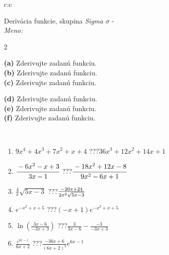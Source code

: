 \documentclass[10pt]{report}
\begin{document}
\newpage
\thispagestyle{empty}
\begin{tabular}{c:c}
\begin{minipage}[c][104.5mm][t]{0.5\linewidth}
\begin{center}
\vspace{7mm}
{\huge Derivácia funkcie, skupina \textit{Sigma $\sigma$} -}\\[5mm]
\textit{Meno:}\phantom{xxxxxxxxxxxxxxxxxxxxxxxxxxxxxxxxxxxxxxxxxxxxxxxxxxxxxxxxxxxxxxxxx}\\[5mm]
\begin{minipage}{0.95\linewidth}
\begin{center}
{\small \begin{multicols}{2} \raggedright
\textbf{(a)} Zderivujte zadanú funkciu. \\[1mm]
\textbf{(b)} Zderivujte zadanú funkciu. \\[1mm]
\textbf{(c)} Zderivujte zadanú funkciu. \par \columnbreak
\textbf{(d)} Zderivujte zadanú funkciu. \\[1mm]
\textbf{(e)} Zderivujte zadanú funkciu. \\[1mm]
\textbf{(f)} Zderivujte zadanú funkciu.
\end{multicols}
}
\end{center}
\end{minipage}
\\[4mm]
\begin{minipage}{0.79\linewidth}
\begin{center}
\begin{varwidth}{\linewidth}
\begin{enumerate}
\normalsize
\item $9x^4+4x^3+7x^2+x+4$\quad \dotfill\; ???\;\dotfill \quad $36x^3+12x^2+14x+1$
\item $\cfrac{-6x^2-x+3}{3x-1}$\quad \dotfill\; ???\;\dotfill \quad $\cfrac{-18x^2+12x-8}{9x^2-6x+1}$
\item $\frac{4}{x}\sqrt{5x-3}$\quad \dotfill\; ???\;\dotfill \quad $\frac{-20x+24}{2x^2 \sqrt{\smash[b]{5x-3}}}$
\item $e^{-x^2+x+5}$\quad \dotfill\; ???\;\dotfill \quad $(-x+1)e^{-x^2+x+5}$
\item $\ln{\left(\frac{3x-6}{-3x+3}\right)}$\quad \dotfill\; ???\;\dotfill \quad $\frac{3}{3x-6}-\frac{-3}{-3x+3}$
\item $\frac{e^{6x-1}}{6x+2}$\quad \dotfill\; ???\;\dotfill \quad $\frac{-36x+6}{(6x+2)^2}e^{6x-1}$
\end{enumerate}

\end{varwidth}
\end{center}
\end{minipage}
\end{center}
\end{minipage}
\end{tabular}
\end{document}
